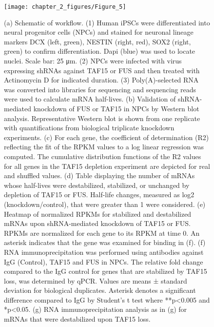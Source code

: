 \begin{figure}[ht]
  \centering
  \texttt{[image: chapter\_2\_figures/Figure\_5]}
  \caption[Figure 5. Loss of TAF15 or FUS affects mRNA stability in human neural precursor cells]{(a) Schematic of workflow. (1) Human iPSCs were differentiated into neural progenitor cells (NPCs) and stained for neuronal lineage markers DCX (left, green), NESTIN (right, red), SOX2 (right, green) to confirm differentiation. Dapi (blue) was used to locate nuclei. Scale bar: 25 μm. (2) NPCs were infected with virus expressing shRNAs against TAF15 or FUS and then treated with Actinomycin D for indicated duration. (3) Poly(A)-selected RNA was converted into libraries for sequencing and sequencing reads were used to calculate mRNA half-lives. (b) Validation of shRNA-mediated knockdown of FUS or TAF15 in NPCs by Western blot analysis. Representative Western blot is shown from one replicate with quantifications from biological triplicate knockdown experiments. (c) For each gene, the coefficient of determination (R2) reflecting the fit of the RPKM values to a log linear regression was computed. The cumulative distribution functions of the R2 values for all genes in the TAF15 depletion experiment are depicted for real and shuffled values. (d) Table displaying the number of mRNAs whose half-lives were destabilized, stabilized, or unchanged by depletion of TAF15 or FUS. Half-life changes, measured as log2 (knockdown/control), that were greater than 1 were considered. (e) Heatmap of normalized RPKMs for stabilized and destabilized mRNAs upon shRNA-mediated knockdown of TAF15 or FUS. RPKMs are normalized for each gene to its RPKM at time 0. An asterisk indicates  that the gene was examined for binding in (f). (f) RNA immunoprecipitation was performed using antibodies against IgG (Control), TAF15 and FUS in NPCs. The relative fold change compared to the IgG control for genes that are stabilized by TAF15 loss, was determined by qPCR. Values are means ± standard deviation for biological duplicates. Asterisk denotes a significant difference compared to IgG by Student’s t test where **p<0.005 and *p<0.05. (g) RNA immunoprecipitation analysis as in (g) for mRNAs that were destabilized upon TAF15 loss. }
  \label{fig:Figure_5}
\end{figure}

